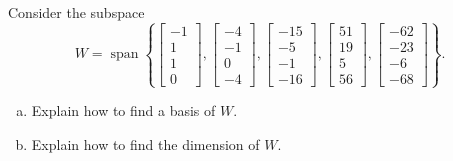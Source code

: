 
\begin{exerciseStatement}


Consider the subspace \[W=\operatorname{span}  \left\{ \left[\begin{array}{c}
-1 \\
1 \\
1 \\
0
\end{array}\right] , \left[\begin{array}{c}
-4 \\
-1 \\
0 \\
-4
\end{array}\right] , \left[\begin{array}{c}
-15 \\
-5 \\
-1 \\
-16
\end{array}\right] , \left[\begin{array}{c}
51 \\
19 \\
5 \\
56
\end{array}\right] , \left[\begin{array}{c}
-62 \\
-23 \\
-6 \\
-68
\end{array}\right] \right\} .\]


\begin{enumerate}[(a)]
\item  Explain how to find a basis of \(W\).
\item  Explain how to find the dimension of \(W\).
\end{enumerate}
    
\end{exerciseStatement}
    
